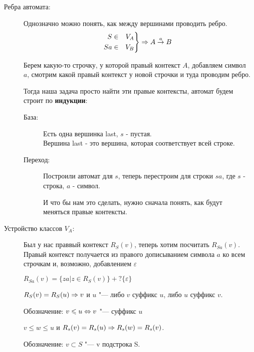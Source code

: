 \begin{description}
    \item[Ребра автомата:]
    Однозначно можно понять, как между вершинами проводить ребро. 
    $$\left.
    \begin{aligned}
    S &\in& V_A\\
    Sa &\in& V_B
    \end{aligned}
    \right\} \Rightarrow A \overset{a}{\rightarrow} B$$
    
    Берем какую-то строчку, у которой правый контекст $A$, добавляем символ $a$, 
    смотрим какой правый контекст у новой строчки и туда проводим ребро.

    Тогда наша задача просто найти эти правые контексты, автомат будем строит по \textbf{индукции}:
    \begin{description}
    \item[База:]
     Есть одна вершинка last, $s$ - пустая.\\
     Вершина last - это вершина, которая соответствует всей строке. 
    \item[Переход:]
     Построили автомат для $s$, теперь перестроим для строки $sa$, где $s$ - строка, $a$ - символ.
    
     И что бы нам это сделать, нужно сначала понять, как будут меняться правые контексты. 
    \end{description}
    \item[Устройство классов $V_A$:]
    \begin{lemma}
    Был у нас праввый контекст $R_S(v)$, теперь хотим посчитать $R_{Sa}(v)$. 
    Правый контекст получается из правого дописыванием символа $a$ ко всем строчкам и, 
    возможно, добавлением $\varepsilon$

    $R_{Sa}(v) = \{za|z \in R_S(v)\} +? \{\varepsilon\}$
    \end{lemma}
    
    \begin{lemma}
    $R_S(v) = R_S(u) \Rightarrow v$ и $u$  "---  либо $v$ суффикс $u$, либо $u$ суффикс $v$. 
    \end{lemma}

    \begin{Def}
    Обозначение: $v \leqslant u \Leftrightarrow v$ "--- суффикс $u$
    \end{Def}

    \begin{lemma}
    $v \le w \le u$ и $R_s(v) = R_s(u) \Rightarrow R_s(w) = R_s(v)$.
    \end{lemma}
    
    \begin{Def}
    Обозначение: $v \subset S$ "--- v подстрока S. 
    \end{Def}


\end{description}
